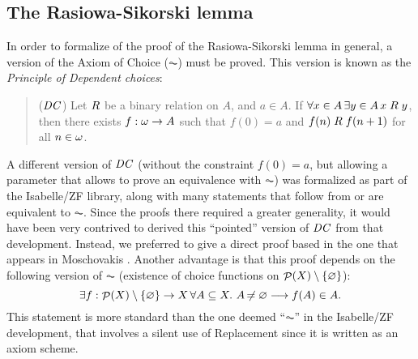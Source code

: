 \subsection{The Rasiowa-Sikorski lemma}
In order to formalize of the proof of the Rasiowa-Sikorski lemma in
general, a version of the Axiom of Choice ($\AC$) must be proved. This
version is known as the \emph{Principle of Dependent choices}:
\begin{quote}
  ($\mathit{DC}$) Let $\mathrel{R}$ be a binary relation on $A$, and $a\in A$. If
  $\forall x\in A\,  \exists y\in A\, x\mathrel{R} y$, then there exists
  $f:\omega\to A$ such that $f(0)=a$ and $f(n)\mathrel{R} f(n+1)$ for all
  $n\in\omega$.
\end{quote}

A different version of $\mathit{DC}$ (without the constraint $f(0)=a$, but
allowing a parameter that allows to prove an equivalence with $\AC$) was
formalized as part of the Isabelle/ZF library, along with many
statements that follow from or are equivalent to $\AC$. Since the
proofs there required a greater generality, it would have been very
contrived to derived this ``pointed'' version of $\mathit{DC}$ from that
development. Instead, we preferred to give a direct proof based in the
one that appears in Moschovakis \cite{moschovakis1994notes}. Another
advantage is that this proof depends on the following version of $\AC$
(existence of choice functions on $\mathop{\mathcal{P}}(X)\setminus \{\varnothing\}$):
\[
\exists f:\mathop{\mathcal{P}}(X)\setminus \{\varnothing\}\to X \, \forall A\subseteq X.\ A\not\nobreak\mkern -2mu = \varnothing \longrightarrow
f(A) \in A.
\]
This statement is more standard than the one deemed ``$\AC$'' in the
Isabelle/ZF development, that involves a silent use of Replacement
since it is written as an axiom scheme.


